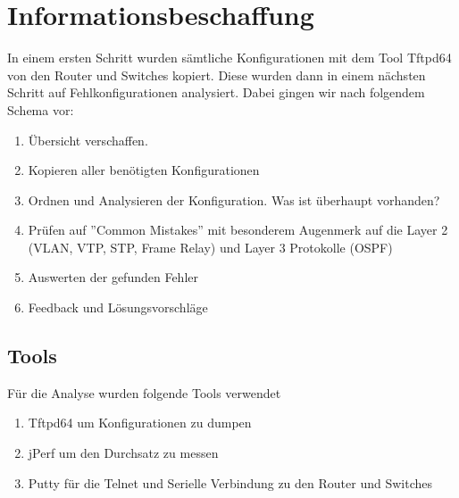

\newcommand{\SUBJECT}{Report}
\newcommand{\TITLE}{Cloud Infrastructre Lab 1}






\section{Informationsbeschaffung}
In einem ersten Schritt wurden sämtliche Konfigurationen mit dem Tool Tftpd64 von den Router und Switches kopiert. Diese wurden dann in einem nächsten Schritt auf Fehlkonfigurationen analysiert. Dabei gingen wir nach folgendem Schema vor:

\begin{enumerate}
	\item Übersicht verschaffen. 
	\item Kopieren aller benötigten Konfigurationen
	\item Ordnen und Analysieren der Konfiguration. Was ist überhaupt vorhanden?
	\item Prüfen auf ''Common Mistakes'' mit besonderem Augenmerk auf die Layer 2 (VLAN, VTP, STP, Frame Relay) und Layer 3 Protokolle (OSPF)
	\item Auswerten der gefunden Fehler
	\item Feedback und Lösungsvorschläge
\end{enumerate}

\subsection{Tools}
Für die Analyse wurden folgende Tools verwendet
\begin{enumerate}
	\item Tftpd64 um Konfigurationen zu dumpen
	\item jPerf um den Durchsatz zu messen
	\item Putty für die Telnet und Serielle Verbindung zu den Router und Switches
\end{enumerate}

